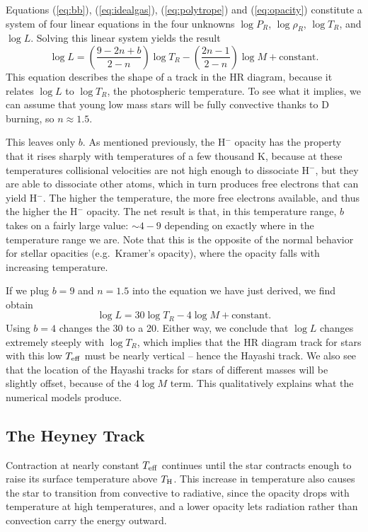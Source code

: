 Equations (\ref{eq:bb}), (\ref{eq:idealgas}), (\ref{eq:polytrope}) and (\ref{eq:opacity}) constitute a system of four linear equations in the four unknowns $\log P_R$, $\log \rho_R$, $\log T_R$, and $\log L$. Solving this linear system yields the result
\begin{equation}
\log L = \left(\frac{9 - 2 n + b}{2-n}\right) \log T_R - \left(\frac{2n-1}{2-n}\right) \log M + \mbox{constant}.
\end{equation}
This equation describes the shape of a track in the HR diagram, because it relates $\log L$ to $\log T_R$, the photospheric temperature. To see what it implies, we can assume that young low mass stars will be fully convective thanks to D burning, so $n\approx 1.5$.

This leaves only $b$. As mentioned previously, the H$^{-}$ opacity has the property that it rises sharply with temperatures of a few thousand K, because at these temperatures collisional velocities are not high enough to dissociate H$^-$, but they are able to dissociate other atoms, which in turn produces free electrons that can yield H$^{-}$. The higher the temperature, the more free electrons available, and thus the higher the H$^{-}$ opacity. The net result is that, in this temperature range, $b$ takes on a fairly large value: $\sim 4-9$ depending on exactly where in the temperature range we are. Note that this is the opposite of the normal behavior for stellar opacities (e.g.\ Kramer's opacity), where the opacity falls with increasing temperature.

If we plug $b = 9$ and $n=1.5$ into the equation we have just derived, we find obtain
\begin{equation}
\log L = 30\log T_R - 4 \log M + \mbox{constant}.
\end{equation}
Using $b=4$ changes the 30 to a 20. Either way, we conclude that $\log L$ changes extremely steeply with $\log T_R$, which implies that the HR diagram track for stars with this low $T_{\rm eff}$ must be nearly vertical -- hence the Hayashi track. We also see that the location of the Hayashi tracks for stars of different masses will be slightly offset, because of the $4\log M$ term. This qualitatively explains what the numerical models produce.

\subsection{The Heyney Track}

Contraction at nearly constant $T_{\rm eff}$ continues until the star contracts enough to raise its surface temperature above $T_{\rm H}$. This increase in temperature also causes the star to transition from convective to radiative, since the opacity drops with temperature at high temperatures, and a lower opacity lets radiation rather than convection carry the energy outward.

